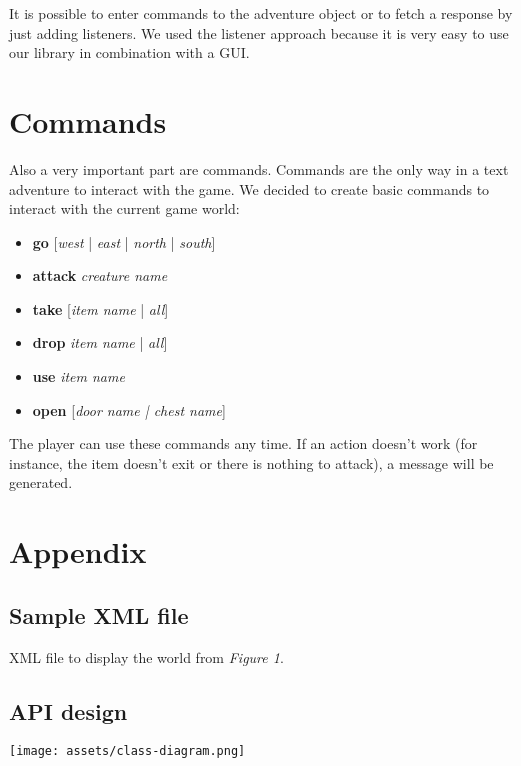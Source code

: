 \documentclass[dvips,12pt]{article}
\begin{document}
It is possible to enter commands to the adventure object or to fetch a response by just adding listeners. We used the listener approach because it is very easy to use our library in combination with a GUI.


\section{Commands}

Also a very important part are commands. Commands are the only way in a text adventure to interact with the game. We decided to create basic commands to interact with the current game world:

\begin{itemize}
	\item{\textbf{go} [\emph{west} | \emph{east} | \emph{north} | \emph{south}]}
	\item{\textbf{attack} \emph{creature name}}
	\item{\textbf{take} [\emph{item name} | \emph{all}]}
	\item{\textbf{drop} \emph{item name} | \emph{all}]}
	\item{\textbf{use} \emph{item name}}
	\item{\textbf{open} [\emph{\emph{door name} | \emph{chest name}}]}
\end{itemize}

The player can use these commands any time. If an action doesn't work (for instance, the item doesn't exit or there is nothing to attack), a message will be generated.

\section{Appendix}

\label{App:xml}

\subsection{Sample XML file}


XML file to display the world from \emph{Figure 1}.


\subsection{API design}
\texttt{[image: assets/class-diagram.png]}
\end{document}
